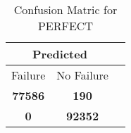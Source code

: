 \begin{table}[] 
\caption{Confusion Matric for PERFECT} 
\label{Table: Prediction Accuracy-DMDPERFECTOnlySunEKF-ignoreReflectionEKF-top2-Reflection} 
\centering 
\begin{tabular} 
 {@{}ccc@{}} 
\toprule 
\multicolumn{2}{c}{\textbf{Predicted}}
 \\ \midrule 
\multicolumn{1}{|c|}{Failure} & 
\multicolumn{1}{c|}{No Failure}
 \\ \midrule 
\multicolumn{1}{|c|}{\color{green}\textbf{77586}} & 
\multicolumn{1}{c|}{\color{red}\textbf{190}}
 \\ \midrule 
\multicolumn{1}{|c|}{\color{red}\textbf{0}} & 
\multicolumn{1}{c|}{\color{green}\textbf{92352}}
 \\ \bottomrule 
\end{tabular} 
\end{table} 
